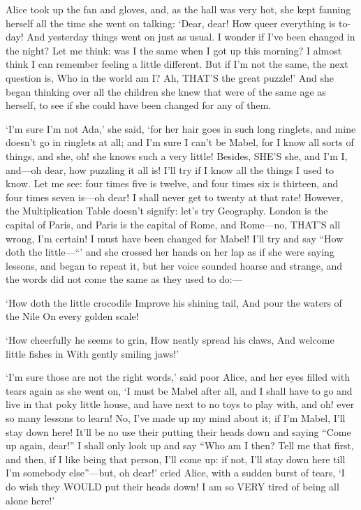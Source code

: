 \documentclass[12pt]{article}
\begin{document}
\begin{Parallel}[p]{}{}
{Alice took up the fan and gloves, and, as the hall was very hot, she kept fanning herself all the time she went on talking: ‘Dear, dear! How queer everything is to-day! And yesterday things went on just as usual. I wonder if I’ve been changed in the night? Let me think: was I the same when I got up this morning? I almost think I can remember feeling a little different. But if I’m not the same, the next question is, Who in the world am I? Ah, THAT’S the great puzzle!’ And she began thinking over all the children she knew that were of the same age as herself, to see if she could have been changed for any of them.

‘I’m sure I’m not Ada,’ she said, ‘for her hair goes in such long ringlets, and mine doesn’t go in ringlets at all; and I’m sure I can’t be Mabel, for I know all sorts of things, and she, oh! she knows such a very little! Besides, SHE’S she, and I’m I, and—oh dear, how puzzling it all is! I’ll try if I know all the things I used to know. Let me see: four times five is twelve, and four times six is thirteen, and four times seven is—oh dear! I shall never get to twenty at that rate! However, the Multiplication Table doesn’t signify: let’s try Geography. London is the capital of Paris, and Paris is the capital of Rome, and Rome—no, THAT’S all wrong, I’m certain! I must have been changed for Mabel! I’ll try and say “How doth the little—“’ and she crossed her hands on her lap as if she were saying lessons, and began to repeat it, but her voice sounded hoarse and strange, and the words did not come the same as they used to do:—

     ‘How doth the little crocodile
      Improve his shining tail,
     And pour the waters of the Nile
      On every golden scale!

     ‘How cheerfully he seems to grin,
      How neatly spread his claws,
     And welcome little fishes in
      With gently smiling jaws!’

‘I’m sure those are not the right words,’ said poor Alice, and her eyes filled with tears again as she went on, ‘I must be Mabel after all, and I shall have to go and live in that poky little house, and have next to no toys to play with, and oh! ever so many lessons to learn! No, I’ve made up my mind about it; if I’m Mabel, I’ll stay down here! It’ll be no use their putting their heads down and saying “Come up again, dear!” I shall only look up and say “Who am I then? Tell me that first, and then, if I like being that person, I’ll come up: if not, I’ll stay down here till I’m somebody else”—but, oh dear!’ cried Alice, with a sudden burst of tears, ‘I do wish they WOULD put their heads down! I am so VERY tired of being all alone here!’

}
\end{Parallel}
\end{document}
